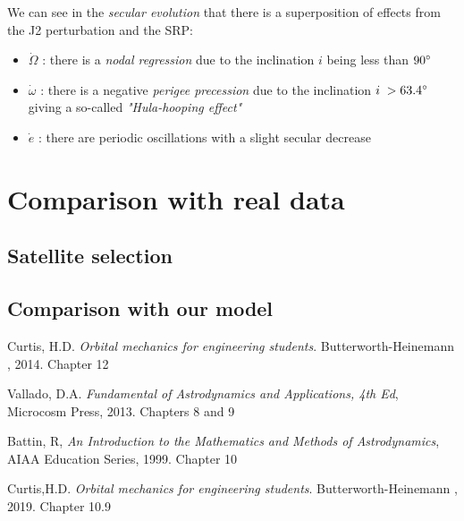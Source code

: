 \documentclass[11pt,a4paper]{report}
\begin{document}
\par We can see in the \emph{secular evolution} that there is a superposition of effects from the J2 perturbation and the SRP:
\begin{itemize}
    \item \emph{$\dot{\Omega}$} : there is a \emph{nodal regression} due to the inclination $i$ being less than $90\degree$
    \item  \emph{$\dot{\omega}$} : there is a negative \emph{perigee precession} due to the inclination $i\;> 63.4\degree$ giving a so-called \emph{"Hula-hooping effect"}
    \item \emph{$\dot{e}$} : there are periodic oscillations with a slight secular decrease
\end{itemize}


\section{Comparison with real data}

\subsection{Satellite selection}

\subsection{Comparison with our model}

\begin{thebibliography}{9}
Curtis, H.D. 
\textit{Orbital mechanics for engineering students}. 
Butterworth-Heinemann , 2014. Chapter 12

Vallado, D.A.
\textit{Fundamental of Astrodynamics and Applications, 4th
Ed}, Microcosm Press, 2013. Chapters 8 and 9

Battin, R,
\textit{An Introduction to the Mathematics and Methods of
Astrodynamics}, AIAA Education Series, 1999. Chapter 10

Curtis,H.D. 
\textit{Orbital mechanics for engineering students}. 
Butterworth-Heinemann , 2019. Chapter 10.9

\end{thebibliography}
\end{document}
